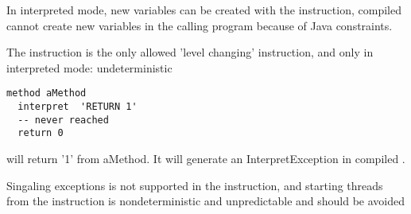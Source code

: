 In interpreted mode, new variables can be created with the  instruction, compiled \nr{} cannot
create new variables in the calling program because of Java constraints.

The  instruction is the only allowed 'level changing' instruction, and only in interpreted mode:
undeterministic
\begin{lstlisting}
method aMethod
  interpret  'RETURN 1'
  -- never reached
  return 0
\end{lstlisting}
will return '1' from aMethod.
It will generate an InterpretException in compiled \nr{}.

Singaling exceptions is not supported in the  instruction, and starting threads from the instruction
is nondeterministic and unpredictable and should be avoided

